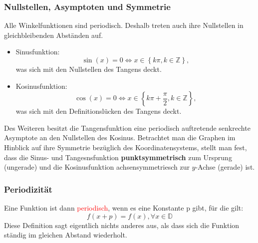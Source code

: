 \subsubsection{Nullstellen, Asymptoten und Symmetrie}
Alle Winkelfunktionen sind periodisch. Deshalb treten auch ihre Nullstellen in gleichbleibenden Abständen auf.
\begin{itemize}
\item Sinusfunktion:
\begin{equation*}
 \sin(x) = 0 \iff x \in \left\{ k \pi, k \in \mathbb{Z} \right\},
\end{equation*}
was sich mit den Nullstellen des Tangens deckt.
\item Kosinusfunktion: 
\begin{equation*}
 \cos(x) = 0 \iff x \in \left\{ k \pi + \frac{\pi}{2}, k \in \mathbb{Z} \right\},
\end{equation*}
was sich mit den Definitionslücken des Tangens deckt.
\end{itemize}
Des Weiteren besitzt die Tangensfunktion eine periodisch auftretende senkrechte Asymptote an den Nullstellen des Kosinus.
Betrachtet man die Graphen im Hinblick auf ihre Symmetrie bezüglich des Koordinatensystems, stellt man fest, dass die Sinus- und Tangesnsfunktion \textbf{punktsymmetrisch} zum Ursprung (ungerade) und die Kosinusfunktion achsensymmetriesch zur $y$-Achse (gerade) ist.

\subsubsection{Periodizität}
Eine Funktion ist dann \textcolor{red}{periodisch}, wenn es eine Konstante p gibt, für die gilt:
\begin{equation*}
f(x+p) = f(x), \forall x\in\mathbb{D}
\end{equation*}
Diese Definition sagt eigentlich nichts anderes aus, als dass sich die Funktion ständig im gleichen Abstand wiederholt.
